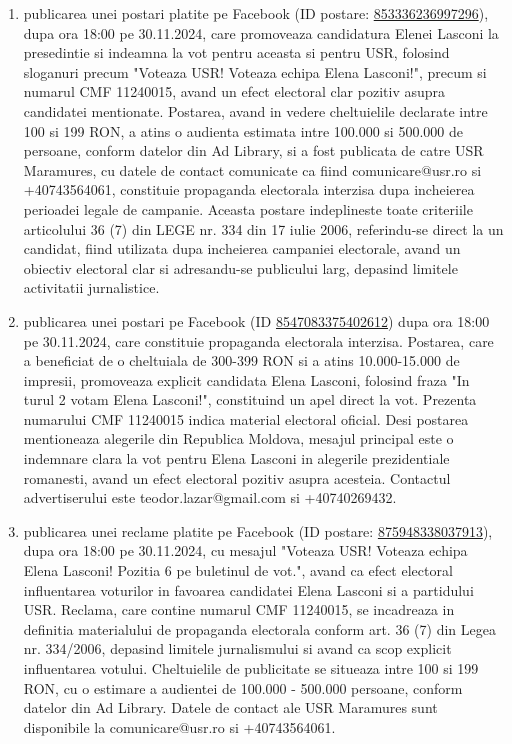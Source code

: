 \documentclass[a4paper,12pt]{article}
\begin{document}
\begin{enumerate}[leftmargin=*, label=\arabic*.)]
    \item publicarea unei postari platite pe Facebook (ID postare: \href{https://www.facebook.com/ads/library/?id=853336236997296}{853336236997296}), dupa ora 18:00 pe 30.11.2024, care promoveaza candidatura Elenei Lasconi la presedintie si indeamna la vot pentru aceasta si pentru USR, folosind sloganuri precum "Voteaza USR! Voteaza echipa Elena Lasconi!",  precum si numarul CMF 11240015,  avand un efect electoral clar pozitiv asupra candidatei mentionate. Postarea, avand in vedere cheltuielile declarate intre 100 si 199 RON, a atins o audienta estimata intre 100.000 si 500.000 de persoane, conform datelor din Ad Library,  si a fost publicata de catre USR Maramures, cu datele de contact comunicate ca fiind comunicare@usr.ro si +40743564061,  constituie propaganda electorala interzisa dupa incheierea perioadei legale de campanie.  Aceasta postare indeplineste toate criteriile articolului 36 (7) din LEGE nr. 334 din 17 iulie 2006, referindu-se direct la un candidat, fiind utilizata dupa incheierea campaniei electorale, avand un obiectiv electoral clar si adresandu-se publicului larg, depasind limitele activitatii jurnalistice.
    \item publicarea unei postari pe Facebook (ID \href{https://www.facebook.com/ads/library/?id=8547083375402612}{8547083375402612}) dupa ora 18:00 pe 30.11.2024, care constituie propaganda electorala interzisa. Postarea, care a beneficiat de o cheltuiala de 300-399 RON si a atins 10.000-15.000 de impresii, promoveaza explicit candidata Elena Lasconi, folosind fraza "In turul 2 votam Elena Lasconi!",  constituind un apel direct la vot.  Prezenta numarului CMF 11240015 indica material electoral oficial.  Desi postarea mentioneaza alegerile din Republica Moldova, mesajul principal este o indemnare clara la vot pentru Elena Lasconi in alegerile prezidentiale romanesti, avand un efect electoral pozitiv asupra acesteia.  Contactul advertiserului este teodor.lazar@gmail.com si +40740269432.
    \item publicarea unei reclame platite pe Facebook (ID postare: \href{https://www.facebook.com/ads/library/?id=875948338037913}{875948338037913}), dupa ora 18:00 pe 30.11.2024, cu mesajul "Voteaza USR! Voteaza echipa Elena Lasconi! Pozitia 6 pe buletinul de vot.",  avand ca efect electoral influentarea voturilor in favoarea candidatei Elena Lasconi si a partidului USR.  Reclama, care contine numarul CMF 11240015, se incadreaza in definitia materialului de propaganda electorala conform art. 36 (7) din Legea nr. 334/2006, depasind limitele jurnalismului si avand ca scop explicit influentarea votului.  Cheltuielile de publicitate se situeaza intre 100 si 199 RON, cu o estimare a audientei de 100.000 - 500.000 persoane, conform datelor din Ad Library.  Datele de contact ale USR Maramures sunt disponibile la comunicare@usr.ro si +40743564061.

\end{enumerate}
\end{document}
